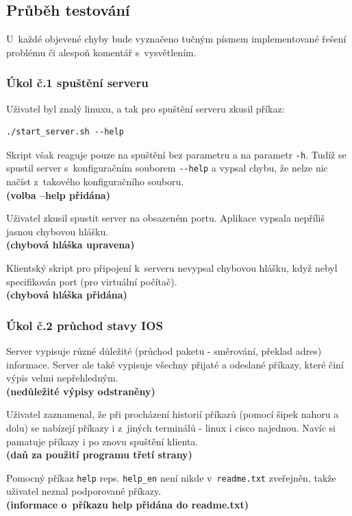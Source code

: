 \subsection{Průběh testování}
U~každé objevené chyby bude vyznačeno tučným písmem implementované řešení problému či alespoň komentář s~vysvětlením. 

\subsubsection{Úkol č.1 spuštění serveru}
Uživatel byl znalý linuxu, a tak pro spuštění serveru zkusil příkaz:
\begin{verbatim}
./start_server.sh --help
\end{verbatim}
Skript však reaguje pouze na spuštění bez parametru a na parametr \verb|-h|. Tudíž se spustil server s~konfiguračním souborem \verb|--help| a vypsal chybu, že nelze nic načíst z~takového konfiguračního souboru.
\\\textbf{(volba --help přidána)}

Uživatel zkusil spustit server na obsazeném portu. Aplikace vypsala nepříliš jasnou chybovou hlášku.
\\\textbf{(chybová hláška upravena)}

Klientský skript pro připojení k~serveru nevypsal chybovou hlášku, když nebyl specifikován port (pro virtuální počítač).
\\\textbf{(chybová hláška přidána)}

\subsubsection{Úkol č.2 průchod stavy IOS}
Server vypisuje různé důležité (průchod paketu - směrování, překlad adres) informace. Server ale také vypisuje všechny přijaté a odeslané příkazy, které činí výpis velmi nepřehledným.
\\\textbf{(nedůležité výpisy odstraněny)}

Uživatel zaznamenal, že při procházení historií příkazů (pomocí šipek nahoru a dolu) se nabízejí příkazy i z~jiných terminálů - linux i cisco najednou. Navíc si pamatuje příkazy i po znovu spuštění klienta.
\\\textbf{(daň za použití programu třetí strany)}

Pomocný příkaz \verb|help| reps. \verb|help_en| není nikde v~\verb|readme.txt| zveřejněn, takže uživatel neznal podporované příkazy.
\\\textbf{(informace o~příkazu help přidána do readme.txt)}

